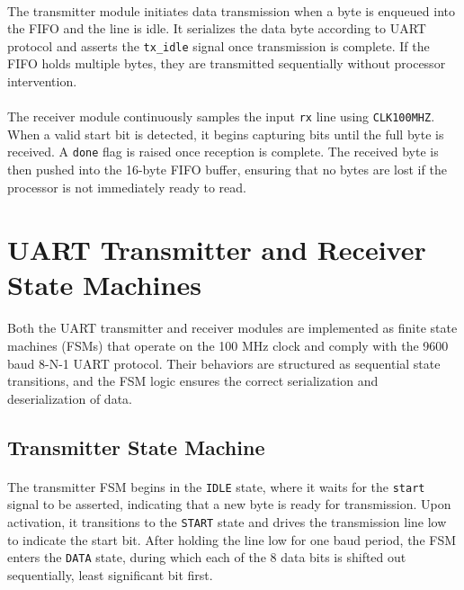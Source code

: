 \documentclass[12pt]{report}
\begin{document}
\paragraph{}
The transmitter module initiates data transmission when a byte is enqueued into the FIFO and the line is idle. It serializes the data byte according to UART protocol and asserts the \texttt{tx\_idle} signal once transmission is complete. If the FIFO holds multiple bytes, they are transmitted sequentially without processor intervention.

\paragraph{}
The receiver module continuously samples the input \texttt{rx} line using \texttt{CLK100MHZ}. When a valid start bit is detected, it begins capturing bits until the full byte is received. A \texttt{done} flag is raised once reception is complete. The received byte is then pushed into the 16-byte FIFO buffer, ensuring that no bytes are lost if the processor is not immediately ready to read.

\section{UART Transmitter and Receiver State Machines}

\paragraph{}
Both the UART transmitter and receiver modules are implemented as finite state machines (FSMs) that operate on the 100 MHz clock and comply with the 9600 baud 8-N-1 UART protocol. Their behaviors are structured as sequential state transitions, and the FSM logic ensures the correct serialization and deserialization of data.

\subsection{Transmitter State Machine}

\paragraph{}
The transmitter FSM begins in the \texttt{IDLE} state, where it waits for the \texttt{start} signal to be asserted, indicating that a new byte is ready for transmission. Upon activation, it transitions to the \texttt{START} state and drives the transmission line low to indicate the start bit. After holding the line low for one baud period, the FSM enters the \texttt{DATA} state, during which each of the 8 data bits is shifted out sequentially, least significant bit first.
\end{document}
